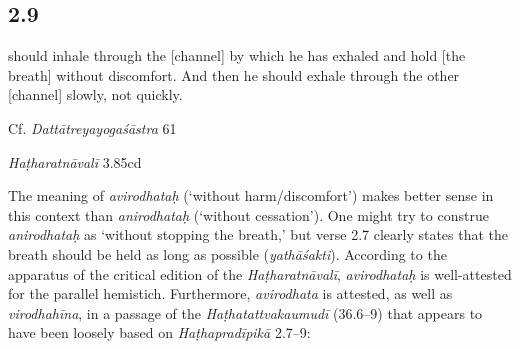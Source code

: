 \begin{ekdosis}

\subsection*{2.9}
\begin{translation} should inhale through the [channel] by which he has exhaled and hold [the breath] without discomfort. And then he should exhale through the other [channel] slowly, not quickly.
\end{translation}

\begin{sources}[hp02_009]
Cf. \emph{Dattātreyayogaśāstra} 61 

\begin{versinnote}
\end{versinnote}
\end{sources}

\begin{testimonia}[hp02_009]
\emph{Haṭharatnāvalī} 3.85cd%

\begin{versinnote}
\tl{\var{85d avirodhataḥ ] anirodhataḥ P}\\!}
\end{versinnote}
\end{testimonia}

\begin{philcomm}[hp02_009]
The meaning of \emph{avirodhataḥ} (‘without harm/discomfort’) makes better sense in this context than \emph{anirodhataḥ} (‘without cessation’). One might try to construe \emph{anirodhataḥ} as ‘without stopping the breath,’ but verse 2.7 clearly states that the breath should be held as long as possible (\emph{yathāśakti}). According to the apparatus of the critical edition of the \emph{Haṭharatnāvalī}, \emph{avirodhataḥ} is well-attested for the parallel hemistich. Furthermore, \emph{avirodhata} is attested, as well as \emph{virodhahīna}, in a passage of the \emph{Haṭhatattvakaumudī} (36.6–9) that appears to have been loosely based on \emph{Haṭhapradīpikā} 2.7–9:


\end{philcomm}
\end{ekdosis}
